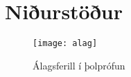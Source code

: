 
\section{Niðurstöður}
\label{sec:nidurstodur}

\begin{figure}[b]
  \centering
  \texttt{[image: alag]}
  \caption{Álagsferill í þolprófun}
  \label{fig:alag}
\end{figure}